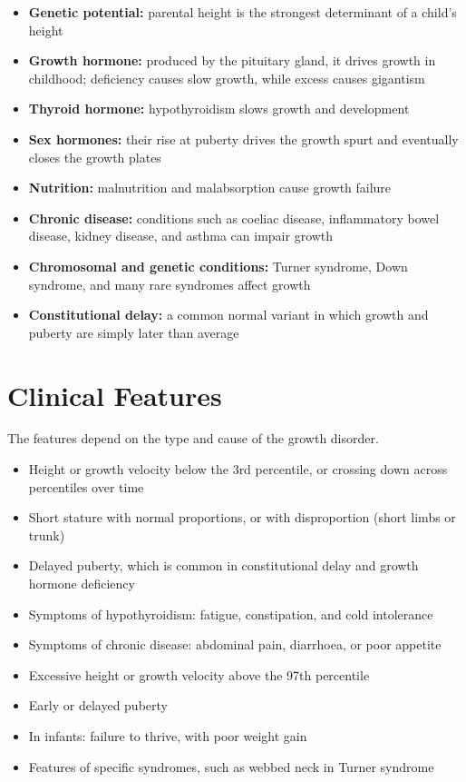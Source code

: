 \begin{itemize}
    \item \textbf{Genetic potential:} parental height is the strongest determinant of a child's height
    \item \textbf{Growth hormone:} produced by the pituitary gland, it drives growth in childhood; deficiency causes slow growth, while excess causes gigantism
    \item \textbf{Thyroid hormone:} hypothyroidism slows growth and development
    \item \textbf{Sex hormones:} their rise at puberty drives the growth spurt and eventually closes the growth plates
    \item \textbf{Nutrition:} malnutrition and malabsorption cause growth failure
    \item \textbf{Chronic disease:} conditions such as coeliac disease, inflammatory bowel disease, kidney disease, and asthma can impair growth
    \item \textbf{Chromosomal and genetic conditions:} Turner syndrome, Down syndrome, and many rare syndromes affect growth
    \item \textbf{Constitutional delay:} a common normal variant in which growth and puberty are simply later than average
\end{itemize}

\section*{Clinical Features}
The features depend on the type and cause of the growth disorder.

\begin{itemize}
    \item Height or growth velocity below the 3rd percentile, or crossing down across percentiles over time
    \item Short stature with normal proportions, or with disproportion (short limbs or trunk)
    \item Delayed puberty, which is common in constitutional delay and growth hormone deficiency
    \item Symptoms of hypothyroidism: fatigue, constipation, and cold intolerance
    \item Symptoms of chronic disease: abdominal pain, diarrhoea, or poor appetite
    \item Excessive height or growth velocity above the 97th percentile
    \item Early or delayed puberty
    \item In infants: failure to thrive, with poor weight gain
    \item Features of specific syndromes, such as webbed neck in Turner syndrome
\end{itemize}


